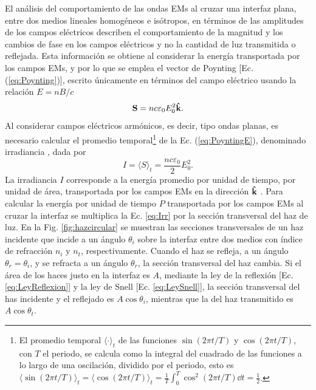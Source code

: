 El análisis del comportamiento de las ondas EMs al cruzar una interfaz plana, entre dos medios lineales homogéneos e isótropos, en términos de las amplitudes de los campos eléctricos describen el comportamiento de la magnitud y los cambios de fase en los campos eléctricos  y no la cantidad de luz transmitida o reflejada. Esta información se obtiene al considerar la energía transportada por los campos EMs, y por lo que se emplea el vector de Poynting [Ec. (\ref{eq:Poynting})], escrito únicamente en términos del campo eléctrico usando la relación $E = n B/c$
	\begin{equation}
	\vb{S} = n c\varepsilon_0 E_0^2 \vu{k}. \label{eq:PoyntingE}
	\end{equation}
Al considerar campos eléctricos armónicos, es decir, tipo ondas planas, es necesario calcular el promedio temporal\footnote{ El promedio temporal $\langle\cdot\rangle_t$ de las funciones $\sin(2\pi t/T)$ y $\cos(2\pi t/T)$, con $T$ el  periodo, se calcula como la integral del cuadrado de las funciones a lo largo de una oscilaci\'on, dividido por el periodo, esto es $\langle \sin(2\pi t/T)\rangle_t =\langle \cos(2\pi t/T)\rangle_t =  \frac{1}{T}\int_0^T\cos^2(2\pi t/T)\dd t = \frac12 $.} de la Ec. (\ref{eq:PoyntingE}), denominado  irradiancia \cite{hecht1998optics}, dada por
	\begin{equation}
	I = \langle S \rangle_t = \frac{nc\varepsilon_0}{2} E_0^2.
	\label{eq:Irr}
	\end{equation}
La irradiancia $I$ corresponde a la energía promedio por unidad de tiempo, por unidad de área, transportada por los campos EMs en la dirección $\vu{k}$ \cite{griffiths2013electrodynamics}. Para calcular la energía por unidad de tiempo $P$ transportada por los campos EMs al cruzar la interfaz se multiplica la Ec. \eqref{eq:Irr} por la sección transversal del haz de luz. En la Fig. \ref{fig:hazcircular} se muestran las secciones transversales de un haz incidente que incide a un ángulo $\theta_i$ sobre la interfaz entre dos medios con índice de refracción $n_i$ y $n_t$, respectivamente. Cuando el haz se refleja, a un ángulo $\theta_r=\theta_i$, y se refracta a un ángulo $\theta_r$, la sección transversal del haz cambia. Si el área de los haces justo en la interfaz es $A$, mediante la ley de la reflexión [Ec. \eqref{eq:LeyReflexion}] y la ley de Snell [Ec. \eqref{eq:LeySnell}], la sección transversal del has incidente y el reflejado  es $A\cos\theta_i$, mientras que la del haz transmitido es $A\cos\theta_t$.

